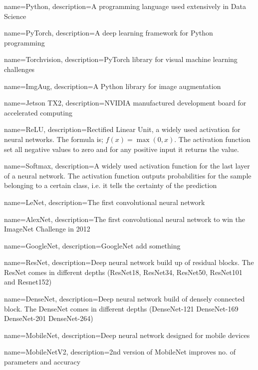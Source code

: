 {
	name=Python,
	description={A programming language used extensively in Data Science}
}

{
	name=PyTorch,
	description={A deep learning framework for Python programming}
}

{
	name={Torchvision},
	description={PyTorch library for visual machine learning challenges}
}

{
	name={ImgAug},
	description={A Python library for image augmentation}}

{
	name=Jetson TX2,
	description={NVIDIA manufactured development board for accelerated computing}
}


{
	name=ReLU,
	description={Rectified Linear Unit, a widely used activation for neural networks. The formula is; $f(x)=\max(0,x)$. The activation function set all negative values to zero and for any positive input it returns the value.}
}

{
	name=Softmax,
	description={A widely used activation function for the last layer of a neural network. The activation function outputs probabilities for the sample belonging to a certain class, i.e. it tells the certainty of the prediction}
}

{
	name={LeNet},
	description={The first convolutional neural network}
}

{
	name={AlexNet},
	description={The first convolutional neural network to win the ImageNet Challenge in 2012}
}

{
	name={GoogleNet},
	description={GoogleNet add something}
}

{
	name={ResNet},
	description={Deep neural network build up of residual blocks. The ResNet comes in different depths (ResNet18, ResNet34, ResNet50, ResNet101 and Resnet152)}
}

{
	name={DenseNet},
	description={Deep neural network build of densely connected block. The DenseNet comes in different depths (DenseNet-121 DenseNet-169 DenseNet-201 DenseNet-264)}
}

{
	name={MobileNet},
	description={Deep neural network designed for mobile devices}
}

{
	name={MobileNetV2},
	description={2nd version of MobileNet improves no. of parameters and accuracy}
}

